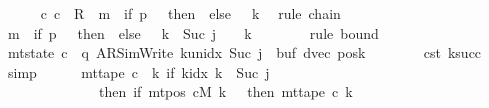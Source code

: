 \begin{isabellebody}
\ \ \ \ \isamarkupfalse%
\ {\isachardoublequoteopen}{\isacharparenleft}{\kern0pt}c{}{\isacharcomma}{\kern0pt}\ c{\isacharprime}{\kern0pt}{\isacharparenright}{\kern0pt}\ {\isasymin}\ R{\isacharprime}{\kern0pt}\ {\isacharcircum}{\kern0pt}{\isacharcircum}{\kern0pt}\ {\isacharparenleft}{\kern0pt}m\ {\isacharplus}{\kern0pt}\ {\isacharparenleft}{\kern0pt}if\ {\isacharquery}{\kern0pt}p\ {\isacharequal}{\kern0pt}\ {}\ then\ {}\ else\ {}\ {\isacharasterisk}{\kern0pt}\ {\isacharquery}{\kern0pt}k{\isacharparenright}{\kern0pt}{\isacharparenright}{\kern0pt}{\isachardoublequoteclose}\ \isamarkupfalse%
\ {\isacharparenleft}{\kern0pt}rule\ chain{\isacharparenright}{\kern0pt}\isanewline
\ \ \ \ \isamarkupfalse%
\ {\isachardoublequoteopen}m\ {\isacharplus}{\kern0pt}\ {\isacharparenleft}{\kern0pt}if\ {\isacharquery}{\kern0pt}p\ {\isacharequal}{\kern0pt}\ {}\ then\ {}\ else\ {}\ {\isacharasterisk}{\kern0pt}\ {\isacharquery}{\kern0pt}k{\isacharparenright}{\kern0pt}\ {\isasymle}\ Suc\ j\ {\isacharasterisk}{\kern0pt}\ {\isacharparenleft}{\kern0pt}{}\ {\isacharasterisk}{\kern0pt}\ {\isacharquery}{\kern0pt}k{\isacharparenright}{\kern0pt}{\isachardoublequoteclose}\isanewline
\ \ \ \ \ \ \isamarkupfalse%
\ {\isacharparenleft}{\kern0pt}rule\ bound{\isacharparenright}{\kern0pt}\isanewline
\ \ \ \ \isamarkupfalse%
\ {\isachardoublequoteopen}mt{\isacharunderscore}{\kern0pt}state\ c{\isacharprime}{\kern0pt}\ {\isacharequal}{\kern0pt}\ {\isacharparenleft}{\kern0pt}q{\isacharcomma}{\kern0pt}\ AR{\isacharunderscore}{\kern0pt}SimWrite{\isacharcomma}{\kern0pt}\ k{\isacharunderscore}{\kern0pt}unidx\ {\isacharparenleft}{\kern0pt}Suc\ j{\isacharparenright}{\kern0pt}{\isacharcomma}{\kern0pt}\ {}{\isacharcomma}{\kern0pt}\ buf{\isacharcomma}{\kern0pt}\ dvec{\isacharcomma}{\kern0pt}\ posk{\isacharparenright}{\kern0pt}{\isachardoublequoteclose}\isanewline
\ \ \ \ \ \ \isamarkupfalse%
\ c{\isacharprime}{\kern0pt}{\isacharunderscore}{\kern0pt}st\ ksucc\ \isamarkupfalse%
\ simp\isanewline
\ \ \ \ \isamarkupfalse%
\ {\isachardoublequoteopen}mt{\isacharunderscore}{\kern0pt}tape\ c{\isacharprime}{\kern0pt}\ {\isacharequal}{\kern0pt}\ {\isacharparenleft}{\kern0pt}{\isasymlambda}k{\isachardot}{\kern0pt}\ if\ k{\isacharunderscore}{\kern0pt}idx\ k\ {\isacharless}{\kern0pt}\ Suc\ j\isanewline
\ \ \ \ \ \ \ \ \ \ \ \ \ \ then\ {\isacharparenleft}{\kern0pt}if\ mt{\isacharunderscore}{\kern0pt}pos\ cM\ k\ {\isacharequal}{\kern0pt}\ {}\ then\ mt{\isacharunderscore}{\kern0pt}tape\ c{}\ k\isanewline

\end{isabellebody}
